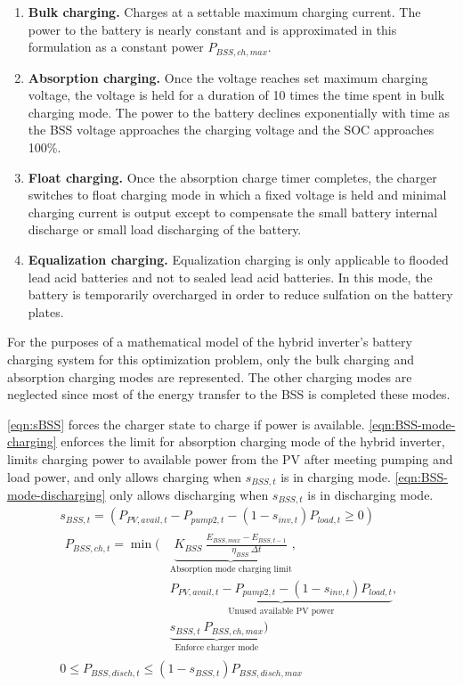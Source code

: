 \begin{enumerate}
	\item \textbf{Bulk charging.} Charges at a settable maximum charging current. The power to the battery is nearly constant and is approximated in this formulation as a constant power $P_{BSS,ch,max}$.
	\item \textbf{Absorption charging.} Once the voltage reaches set maximum charging voltage, the voltage is held for a duration of 10 times the time spent in bulk charging mode. The power to the battery declines exponentially with time as the BSS voltage approaches the charging voltage and the SOC approaches 100\%.
	\item \textbf{Float charging.} Once the absorption charge timer completes, the charger switches to float charging mode in which a fixed voltage is held and minimal charging current is output except to compensate the small battery internal discharge or small load discharging of the battery.
	\item \textbf{Equalization charging.} Equalization charging is only applicable to flooded lead acid batteries and not to sealed lead acid batteries. In this mode, the battery is temporarily overcharged in order to reduce sulfation on the battery plates.
\end{enumerate}

For the purposes of a mathematical model of the hybrid inverter's battery charging system for this optimization problem, only the bulk charging and absorption charging modes are represented. The other charging modes are neglected since most of the energy transfer to the BSS is completed these modes.

\autoref{eqn:sBSS} forces the charger state to charge if power is available.
\autoref{eqn:BSS-mode-charging} enforces the limit for absorption charging mode of the hybrid inverter,
limits charging power to available power from the PV after meeting pumping and load power,
and only allows charging when $s_{BSS,t}$ is in charging mode.
\autoref{eqn:BSS-mode-discharging} only allows discharging when $s_{BSS,t}$ is in discharging mode.
%
\begin{gather}
\label{eqn:sBSS}
s_{BSS,t} = \left( P_{PV,avail,t} - P_{pump2,t} - (1 - s_{inv,t}) P_{load,t} \ge 0 \right)
\\
\label{eqn:BSS-mode-charging}
\begin{aligned}
P_{BSS,ch,t} = \min\Big(
& \underbrace{K_{BSS} \ \frac{E_{BSS,max} - E_{BSS,t-1}}{\eta_{BSS} \ \Delta t}}_
{\textrm{Absorption mode charging limit}},
\\
& \underbrace{P_{PV,avail,t} - P_{pump2,t} - (1 - s_{inv,t}) P_{load,t}}_
{\textrm{Unused available PV power}},
\\
& \underbrace{s_{BSS,t} \ P_{BSS,ch,max}}_  
{\textrm{Enforce charger mode}} \Big)
\end{aligned}
\\
\label{eqn:BSS-mode-discharging}
0 \le P_{BSS,disch,t} \le \left(1 - s_{BSS,t}\right) P_{BSS,disch,max}
\end{gather}

